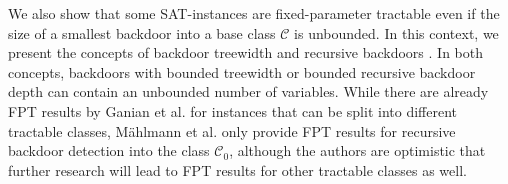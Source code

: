\documentclass[11pt,a4paper]{article}
\theoremstyle{definition}
\theoremstyle{proposition}
\begin{document}
We also show that some SAT-instances are fixed-parameter tractable even if the size of a smallest backdoor into a base class $\mathcal{C}$ is unbounded. In this context, we present the concepts of backdoor treewidth \cite{GanianBackdoorTreewidth} and recursive backdoors \cite{maehlmann2021recursive}. In both concepts, backdoors with bounded treewidth or bounded recursive backdoor depth can contain an unbounded number of variables. While there are already FPT results by Ganian et al.\cite[p.30]{GanianBackdoorTreewidth} for instances that can be split into different tractable classes, Mählmann et al. only provide FPT results for recursive backdoor detection into the class $\mathcal{C}_0$, although the authors are optimistic that further research will lead to FPT results for other tractable classes as well. 




\end{document}
